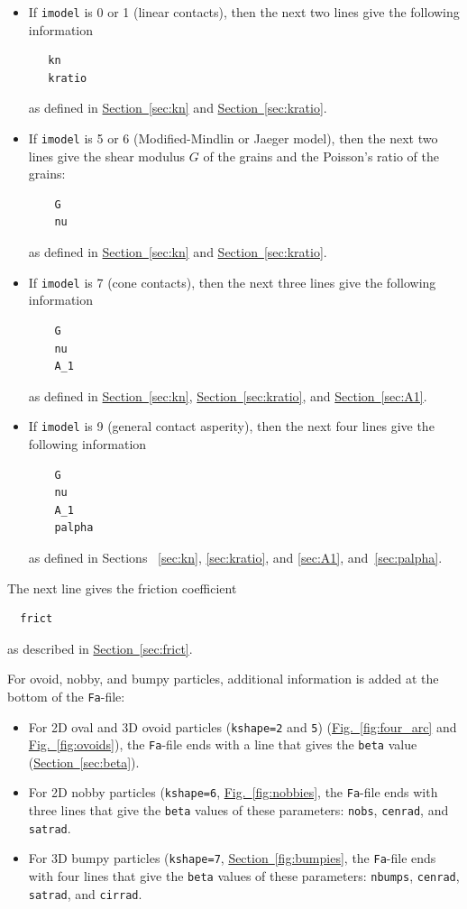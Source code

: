 \documentclass[letterpaper,11pt]{article}
\begin{document}
\begin{itemize}
\item
If \texttt{imodel} is 0 or 1 (linear contacts), then
the next two lines give the following information
\begin{verbatim}
   kn
   kratio
\end{verbatim}
as defined in
\hyperref[sec:kn]{Section~\ref*{sec:kn}}
and \hyperref[sec:kratio]{Section~\ref*{sec:kratio}}.
\item
If \texttt{imodel} is 5 or 6 (Modified-Mindlin or Jaeger model),
then the next two lines give the shear modulus $G$ of the grains
and the Poisson's ratio of the grains:
\begin{verbatim}
    G
    nu
\end{verbatim}
as defined in 
\hyperref[sec:kn]{Section~\ref*{sec:kn}}
and \hyperref[sec:kratio]{Section~\ref*{sec:kratio}}.
%
\item
If \texttt{imodel} is 7 (cone contacts), then
the next three lines give the following information
\begin{verbatim}
    G
    nu
    A_1
\end{verbatim}
as defined in
\hyperref[sec:kn]{Section~\ref*{sec:kn}},
\hyperref[sec:kratio]{Section~\ref*{sec:kratio}},
and \hyperref[sec:A1]{Section~\ref*{sec:A1}}.
\item
If \texttt{imodel} is 9 (general contact asperity), then
the next four lines give the following information
\begin{verbatim}
    G
    nu
    A_1
    palpha
\end{verbatim}
as defined in Sections~
\hyperref[sec:kn]{\ref*{sec:kn}},
\hyperref[sec:kratio]{\ref*{sec:kratio}},
and \hyperref[sec:A1]{\ref*{sec:A1}},
and~\hyperref[sec:palpha]{\ref*{sec:palpha}}.
\end{itemize}
%
The next line gives the friction coefficient
\begin{verbatim}
  frict
\end{verbatim}
as described in
\hyperref[sec:frict]{Section~\ref*{sec:frict}}.
%
\par
For ovoid, nobby, and bumpy particles,
additional information is added at the bottom of
the \texttt{Fa}-file:
\begin{itemize}
  \item
  For 2D oval and 3D ovoid particles
  (\texttt{kshape=2} and \texttt{5})
  (\hyperref[fig:four_arc]{Fig.~\ref*{fig:four_arc}}
  and \hyperref[fig:ovoids]{Fig.~\ref*{fig:ovoids}}),
  the \texttt{Fa}-file ends with a line
  that gives the \texttt{beta} value
  (\hyperref[sec:beta]{Section~\ref*{sec:beta}}).
  \item
  For 2D nobby particles (\texttt{kshape=6},
  \hyperref[fig:nobbies]{Fig.~\ref*{fig:nobbies}},
  the \texttt{Fa}-file ends with three lines
  that give the \texttt{beta} values of
  these parameters: \texttt{nobs}, \texttt{cenrad},
  and \texttt{satrad}.
  \item
  For 3D bumpy particles (\texttt{kshape=7},
  \hyperref[fig:bumpies]{Section~\ref*{fig:bumpies}},
  the \texttt{Fa}-file ends with four lines
  that give the \texttt{beta} values of
  these parameters: \texttt{nbumps}, \texttt{cenrad},
  \texttt{satrad}, and \texttt{cirrad}.
\end{itemize}
%
%
\end{document}
